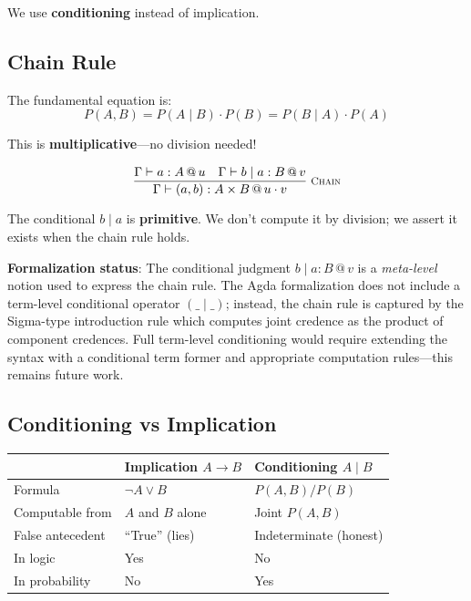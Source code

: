 \documentclass[11pt,a4paper]{article}
\makeatletter
\newcommand{\infer}[3][]{%
  \genfrac{}{}{0.4pt}{0}{#3}{#2}\;\textsc{\footnotesize #1}%
}
\newcommand{\at}[1]{\,@\,#1}
\newcommand{\negc}{\neg}
\makeatother
\begin{document}
We use \textbf{conditioning} instead of implication.

\subsection{Chain Rule}

The fundamental equation is:
\[
P(A, B) = P(A \mid B) \cdot P(B) = P(B \mid A) \cdot P(A)
\]

This is \textbf{multiplicative}---no division needed!

\begin{gather}
\infer[\textsc{Chain}]
  {\Gamma \vdash (a, b) : A \times B \at{u \cdot v}}
  {\Gamma \vdash a : A \at{u} \quad \Gamma \vdash b \mid a : B \at{v}}
\end{gather}

The conditional $b \mid a$ is \textbf{primitive}. We don't compute it by division; we assert it exists when the chain rule holds.

\textbf{Formalization status}: The conditional judgment $b \mid a : B \at{v}$ is a \emph{meta-level} notion used to express the chain rule. The Agda formalization does not include a term-level conditional operator $(\_ \mid \_)$; instead, the chain rule is captured by the Sigma-type introduction rule which computes joint credence as the product of component credences. Full term-level conditioning would require extending the syntax with a conditional term former and appropriate computation rules---this remains future work.

\subsection{Conditioning vs Implication}

\begin{center}
\begin{tabular}{l|l|l}
& \textbf{Implication} $A \to B$ & \textbf{Conditioning} $A \mid B$ \\
\hline
Formula & $\negc A \vee B$ & $P(A,B) / P(B)$ \\
Computable from & $A$ and $B$ alone & Joint $P(A,B)$ \\
False antecedent & ``True'' (lies) & Indeterminate (honest) \\
In logic & Yes & No \\
In probability & No & Yes \\
\end{tabular}
\end{center}
\end{document}
